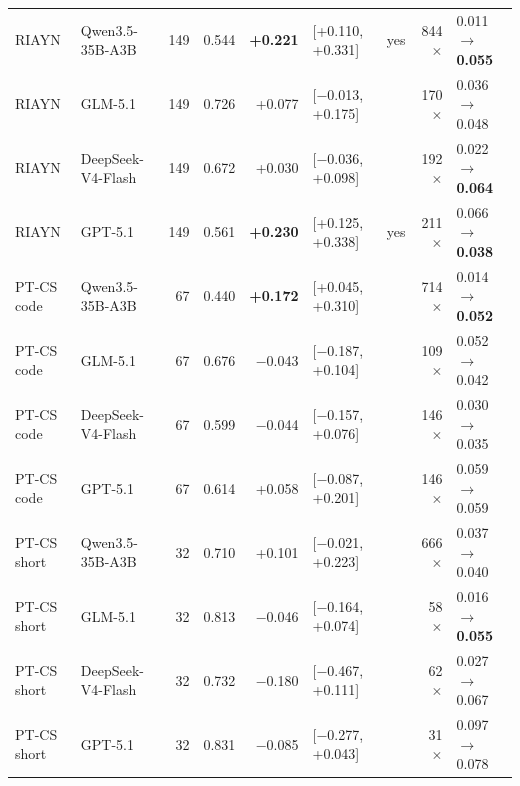 \documentclass[10pt]{article}
\begin{document}
\begin{longtable}{llrrrlcrl}
RIAYN & Qwen3.5-35B-A3B & 149 & 0.544 & \textbf{+0.221} & [+0.110, +0.331] & yes & 844$\times$ & 0.011 $\to$ \textbf{0.055} \\
RIAYN & GLM-5.1 & 149 & 0.726 & +0.077 & [$-$0.013, +0.175] &  & 170$\times$ & 0.036 $\to$ 0.048 \\
RIAYN & DeepSeek-V4-Flash & 149 & 0.672 & +0.030 & [$-$0.036, +0.098] &  & 192$\times$ & 0.022 $\to$ \textbf{0.064} \\
RIAYN & GPT-5.1 & 149 & 0.561 & \textbf{+0.230} & [+0.125, +0.338] & yes & 211$\times$ & 0.066 $\to$ \textbf{0.038} \\
PT-CS code & Qwen3.5-35B-A3B & 67 & 0.440 & \textbf{+0.172} & [+0.045, +0.310] &  & 714$\times$ & 0.014 $\to$ \textbf{0.052} \\
PT-CS code & GLM-5.1 & 67 & 0.676 & $-$0.043 & [$-$0.187, +0.104] &  & 109$\times$ & 0.052 $\to$ 0.042 \\
PT-CS code & DeepSeek-V4-Flash & 67 & 0.599 & $-$0.044 & [$-$0.157, +0.076] &  & 146$\times$ & 0.030 $\to$ 0.035 \\
PT-CS code & GPT-5.1 & 67 & 0.614 & +0.058 & [$-$0.087, +0.201] &  & 146$\times$ & 0.059 $\to$ 0.059 \\
PT-CS short & Qwen3.5-35B-A3B & 32 & 0.710 & +0.101 & [$-$0.021, +0.223] &  & 666$\times$ & 0.037 $\to$ 0.040 \\
PT-CS short & GLM-5.1 & 32 & 0.813 & $-$0.046 & [$-$0.164, +0.074] &  & 58$\times$ & 0.016 $\to$ \textbf{0.055} \\
PT-CS short & DeepSeek-V4-Flash & 32 & 0.732 & $-$0.180 & [$-$0.467, +0.111] &  & 62$\times$ & 0.027 $\to$ 0.067 \\
PT-CS short & GPT-5.1 & 32 & 0.831 & $-$0.085 & [$-$0.277, +0.043] &  & 31$\times$ & 0.097 $\to$ 0.078 \\
\hline
\end{longtable}
\endgroup
\end{document}
